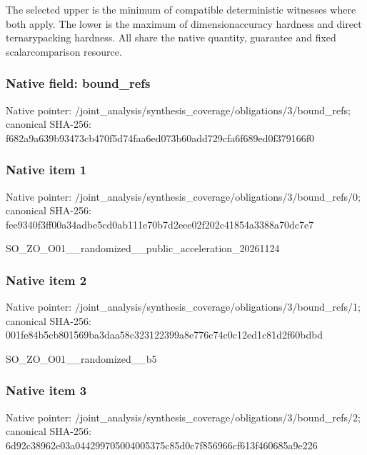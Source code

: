 \documentclass[10pt,a4paper]{article}
\begin{document}
The selected upper is the minimum of compatible deterministic witnesses where both apply. The lower is the maximum of dimensionaccuracy hardness and direct ternarypacking hardness. All share the native quantity, guarantee and fixed scalarcomparison resource.


\subsubsection{Native field: bound\_refs}


Native pointer: /joint\_analysis/synthesi\allowbreak{}s\_coverage/obligations/3\allowbreak{}/bound\_refs; canonical SHA-256: f682a9a639b93473cb470f5d\allowbreak{}74faa6ed073b60add729cfa6\allowbreak{}f689ed0f379166f0



\subsubsection{Native item 1}


Native pointer: /joint\_analysis/synthesi\allowbreak{}s\_coverage/obligations/3\allowbreak{}/bound\_refs/0; canonical SHA-256: fee9340f3ff00a34adbe5cd0\allowbreak{}ab111e70b7d2eee02f202c41\allowbreak{}854a3388a70dc7e7


SO\_ZO\_O01\_\_randomized\_\_p\allowbreak{}ublic\_acceleration\_20261\allowbreak{}124


\subsubsection{Native item 2}


Native pointer: /joint\_analysis/synthesi\allowbreak{}s\_coverage/obligations/3\allowbreak{}/bound\_refs/1; canonical SHA-256: 001fe84b5cb801569ba3daa5\allowbreak{}8c323122399a8e776c74c0c1\allowbreak{}2ed1c81d2f60bdbd


SO\_ZO\_O01\_\_randomized\_\_b5


\subsubsection{Native item 3}


Native pointer: /joint\_analysis/synthesi\allowbreak{}s\_coverage/obligations/3\allowbreak{}/bound\_refs/2; canonical SHA-256: 6d92c38962e03a0442997050\allowbreak{}04005375c85d0c7f856966cf\allowbreak{}613f460685a9e226
\end{document}
